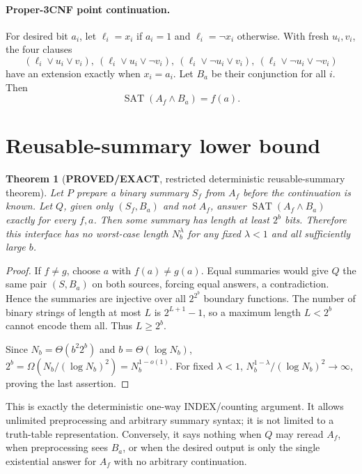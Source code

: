 \documentclass[11pt]{article}
\newtheorem{theorem}{Theorem}
\newcommand{\EXACT}{\textbf{PROVED/EXACT}}
\begin{document}
\paragraph{Proper-3CNF point continuation.}
For desired bit $a_i$, let $\ell_i=x_i$ if $a_i=1$ and
$\ell_i=\neg x_i$ otherwise.  With fresh $u_i,v_i$, the four clauses
\[
(\ell_i\vee u_i\vee v_i),\ (\ell_i\vee u_i\vee\neg v_i),\
(\ell_i\vee\neg u_i\vee v_i),\ (\ell_i\vee\neg u_i\vee\neg v_i)
\]
have an extension exactly when $x_i=a_i$.  Let $B_a$ be their conjunction for
all $i$.  Then
\[
 \operatorname{SAT}(A_f\land B_a)=f(a).
\]

\section{Reusable-summary lower bound}
\begin{theorem}[\EXACT, restricted deterministic reusable-summary theorem]
Let $P$ prepare a binary summary $S_f$ from $A_f$ before the continuation is
known.  Let $Q$, given only $(S_f,B_a)$ and not $A_f$, answer
$\operatorname{SAT}(A_f\land B_a)$ exactly for every $f,a$.  Then some summary
has length at least $2^b$ bits.  Therefore this interface has no worst-case
length $N_b^\lambda$ for any fixed $\lambda<1$ and all sufficiently large $b$.
\end{theorem}
\begin{proof}
If $f\ne g$, choose $a$ with $f(a)\ne g(a)$.  Equal summaries would give $Q$
the same pair $(S,B_a)$ on both sources, forcing equal answers, a contradiction.
Hence the summaries are injective over all $2^{2^b}$ boundary functions.  The
number of binary strings of length at most $L$ is $2^{L+1}-1$, so a maximum
length $L<2^b$ cannot encode them all.  Thus $L\ge2^b$.

Since $N_b=\Theta(b^2 2^b)$ and $b=\Theta(\log N_b)$,
$2^b=\Omega(N_b/(\log N_b)^2)=N_b^{1-o(1)}$.  For fixed $\lambda<1$,
$N_b^{1-\lambda}/(\log N_b)^2\to\infty$, proving the last assertion.
\end{proof}

This is exactly the deterministic one-way INDEX/counting argument.  It allows
unlimited preprocessing and arbitrary summary syntax; it is not limited to a
truth-table representation.  Conversely, it says nothing when $Q$ may reread
$A_f$, when preprocessing sees $B_a$, or when the desired output is only the
single existential answer for $A_f$ with no arbitrary continuation.
\end{document}
